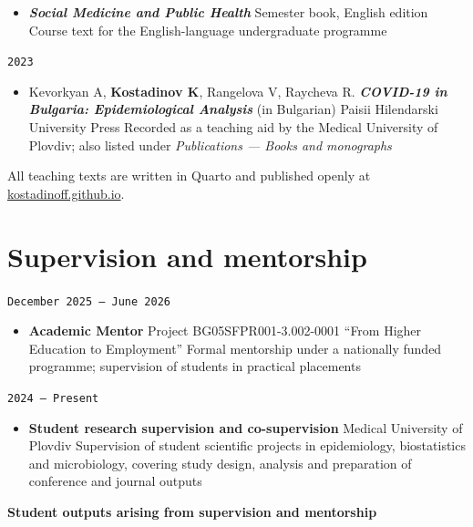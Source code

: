\documentclass[
  10.5pt,
  a4paper,
  DIV=11,
  numbers=noendperiod]{scrartcl}
\providecommand{\tightlist}{%
  \setlength{\itemsep}{0pt}\setlength{\parskip}{0pt}}
\let\oldtexttt\texttt
\renewcommand{\texttt}[1]{{\color{cvbronze}\small\oldtexttt{#1}}}
\begin{document}
\begin{itemize}
\tightlist
\item
  \textbf{\emph{Social Medicine and Public Health}} \textbar{} Semester
  book, English edition \textbar{} Course text for the English-language
  undergraduate programme
\end{itemize}

\texttt{2023}

\begin{itemize}
\tightlist
\item
  Kevorkyan A, \textbf{Kostadinov K}, Rangelova V, Raycheva R.
  \textbf{\emph{COVID-19 in Bulgaria: Epidemiological Analysis}} (in
  Bulgarian) \textbar{} Paisii Hilendarski University Press \textbar{}
  Recorded as a teaching aid by the Medical University of Plovdiv; also
  listed under \emph{Publications --- Books and monographs}
\end{itemize}

All teaching texts are written in Quarto and published openly at
\href{https://kostadinoff.github.io}{kostadinoff.github.io}.

\section{Supervision and mentorship}\label{supervision-and-mentorship}

\texttt{December\ 2025\ –\ June\ 2026}

\begin{itemize}
\tightlist
\item
  \textbf{Academic Mentor} \textbar{} Project BG05SFPR001-3.002-0001
  ``From Higher Education to Employment'' \textbar{} Formal mentorship
  under a nationally funded programme; supervision of students in
  practical placements
\end{itemize}

\texttt{2024\ –\ Present}

\begin{itemize}
\tightlist
\item
  \textbf{Student research supervision and co-supervision} \textbar{}
  Medical University of Plovdiv \textbar{} Supervision of student
  scientific projects in epidemiology, biostatistics and microbiology,
  covering study design, analysis and preparation of conference and
  journal outputs
\end{itemize}

\textbf{Student outputs arising from supervision and mentorship}
\end{document}
